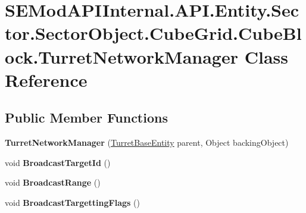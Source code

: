 \hypertarget{class_s_e_mod_a_p_i_internal_1_1_a_p_i_1_1_entity_1_1_sector_1_1_sector_object_1_1_cube_grid_1_1b51091c5d07b0b548101717ac1a5d6ae}{}\section{S\+E\+Mod\+A\+P\+I\+Internal.\+A\+P\+I.\+Entity.\+Sector.\+Sector\+Object.\+Cube\+Grid.\+Cube\+Block.\+Turret\+Network\+Manager Class Reference}
\label{class_s_e_mod_a_p_i_internal_1_1_a_p_i_1_1_entity_1_1_sector_1_1_sector_object_1_1_cube_grid_1_1b51091c5d07b0b548101717ac1a5d6ae}
\subsection*{Public Member Functions}
\begin{DoxyCompactItemize}
\item 
\hypertarget{class_s_e_mod_a_p_i_internal_1_1_a_p_i_1_1_entity_1_1_sector_1_1_sector_object_1_1_cube_grid_1_1b51091c5d07b0b548101717ac1a5d6ae_a756123b5ede4d7354083fe0d202a7dee}{}{\bfseries Turret\+Network\+Manager} (\hyperlink{class_s_e_mod_a_p_i_internal_1_1_a_p_i_1_1_entity_1_1_sector_1_1_sector_object_1_1_cube_grid_1_18bc384bbaf571fbfc8546173f456649e}{Turret\+Base\+Entity} parent, Object backing\+Object)\label{class_s_e_mod_a_p_i_internal_1_1_a_p_i_1_1_entity_1_1_sector_1_1_sector_object_1_1_cube_grid_1_1b51091c5d07b0b548101717ac1a5d6ae_a756123b5ede4d7354083fe0d202a7dee}

\item 
\hypertarget{class_s_e_mod_a_p_i_internal_1_1_a_p_i_1_1_entity_1_1_sector_1_1_sector_object_1_1_cube_grid_1_1b51091c5d07b0b548101717ac1a5d6ae_ae5153c5190731a66ee7708fb7e0bae71}{}void {\bfseries Broadcast\+Target\+Id} ()\label{class_s_e_mod_a_p_i_internal_1_1_a_p_i_1_1_entity_1_1_sector_1_1_sector_object_1_1_cube_grid_1_1b51091c5d07b0b548101717ac1a5d6ae_ae5153c5190731a66ee7708fb7e0bae71}

\item 
\hypertarget{class_s_e_mod_a_p_i_internal_1_1_a_p_i_1_1_entity_1_1_sector_1_1_sector_object_1_1_cube_grid_1_1b51091c5d07b0b548101717ac1a5d6ae_a0d04b6cc3fd047024e7a8011f8081d50}{}void {\bfseries Broadcast\+Range} ()\label{class_s_e_mod_a_p_i_internal_1_1_a_p_i_1_1_entity_1_1_sector_1_1_sector_object_1_1_cube_grid_1_1b51091c5d07b0b548101717ac1a5d6ae_a0d04b6cc3fd047024e7a8011f8081d50}

\item 
\hypertarget{class_s_e_mod_a_p_i_internal_1_1_a_p_i_1_1_entity_1_1_sector_1_1_sector_object_1_1_cube_grid_1_1b51091c5d07b0b548101717ac1a5d6ae_a4a93a6182b00ee20930ee0293824d8e7}{}void {\bfseries Broadcast\+Targetting\+Flags} ()\label{class_s_e_mod_a_p_i_internal_1_1_a_p_i_1_1_entity_1_1_sector_1_1_sector_object_1_1_cube_grid_1_1b51091c5d07b0b548101717ac1a5d6ae_a4a93a6182b00ee20930ee0293824d8e7}

\end{DoxyCompactItemize}
